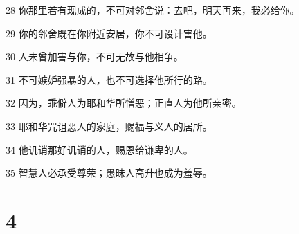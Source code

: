 \par 28 你那里若有现成的，不可对邻舍说：去吧，明天再来，我必给你。
\par 29 你的邻舍既在你附近安居，你不可设计害他。
\par 30 人未曾加害与你，不可无故与他相争。
\par 31 不可嫉妒强暴的人，也不可选择他所行的路。
\par 32 因为，乖僻人为耶和华所憎恶；正直人为他所亲密。
\par 33 耶和华咒诅恶人的家庭，赐福与义人的居所。
\par 34 他讥诮那好讥诮的人，赐恩给谦卑的人。
\par 35 智慧人必承受尊荣；愚昧人高升也成为羞辱。

\chapter{4}

